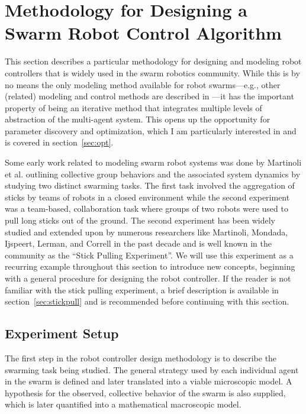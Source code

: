 \documentclass[Main.tex]{subfiles}
\begin{document}
\section{Methodology for Designing a Swarm Robot Control Algorithm}

This section describes a particular methodology for designing and modeling robot controllers that is widely used in the swarm robotics community. While this is by no means the only modeling method available for robot swarms---e.g., other (related) modeling and control methods are described in \cite{Bayazit2005,Berman2007,Billard1999,Sugawara2013}---it has the important property of being an iterative method that integrates multiple levels of abstraction of the multi-agent system. This opens up the opportunity for parameter discovery  and optimization, which I am particularly interested in and is covered in section~\ref{sec:opt}.

Some early work related to modeling swarm robot systems was done by Martinoli et al.\cite{Martinoli1995,Martinoli2004} outlining collective group behaviors and the associated system dynamics by studying two distinct swarming tasks. The first task involved the aggregation of sticks by teams of robots in a closed environment while the second experiment was a team-based, collaboration task where groups of two robots were used to pull long sticks out of the ground. The second experiment has been widely studied and extended upon by numerous researchers like Martinoli, Mondada, Ijspeert, Lerman, and Correll in the past decade and is well known in the community as the ``Stick Pulling Experiment''. We will use this experiment as a recurring example throughout this section to introduce new concepts, beginning with a general procedure for designing the robot controller. If the reader is not familiar with the stick pulling experiment, a brief description is available in section~\ref{sec:stickpull} and is recommended before continuing with this section.

\subsection{Experiment Setup}
The first step in the robot controller design methodology is to describe the swarming task being studied. The general strategy used by each individual agent in the swarm is defined and later translated into a viable microscopic model. A hypothesis for the observed, collective behavior of the swarm is also supplied, which is later quantified into a mathematical macroscopic model.
\end{document}
